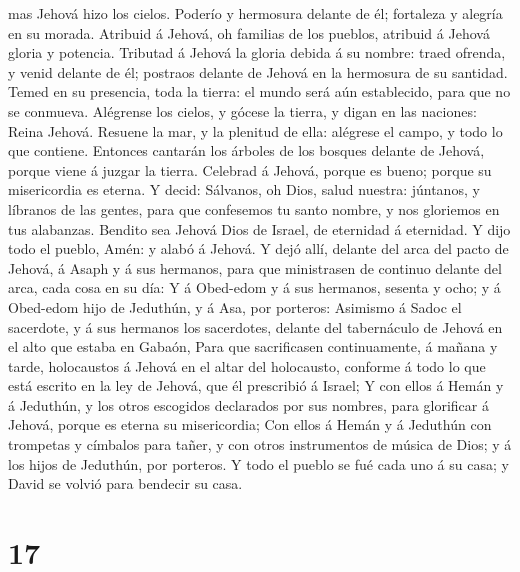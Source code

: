 mas Jehová hizo los cielos.  Poderío y hermosura delante de
él; fortaleza y alegría en su morada.  Atribuid á Jehová,
oh familias de los pueblos, atribuid á Jehová gloria y potencia.
 Tributad á Jehová la gloria debida á su nombre: traed
ofrenda, y venid delante de él; postraos delante de Jehová en la
hermosura de su santidad.  Temed en su presencia, toda la
tierra: el mundo será aún establecido, para que no se conmueva.
 Alégrense los cielos, y gócese la tierra, y digan en las
naciones: Reina Jehová.  Resuene la mar, y la plenitud de
ella: alégrese el campo, y todo lo que contiene.  Entonces
cantarán los árboles de los bosques delante de Jehová, porque viene á
juzgar la tierra.  Celebrad á Jehová, porque es bueno;
porque su misericordia es eterna.  Y decid: Sálvanos, oh
Dios, salud nuestra: júntanos, y líbranos de las gentes, para que
confesemos tu santo nombre, y nos gloriemos en tus alabanzas.
 Bendito sea Jehová Dios de Israel, de eternidad á
eternidad. Y dijo todo el pueblo, Amén: y alabó á Jehová. 
Y dejó allí, delante del arca del pacto de Jehová, á Asaph y á sus
hermanos, para que ministrasen de continuo delante del arca, cada cosa
en su día:  Y á Obed-edom y á sus hermanos, sesenta y ocho;
y á Obed-edom hijo de Jeduthún, y á Asa, por porteros: 
Asimismo á Sadoc el sacerdote, y á sus hermanos los sacerdotes, delante
del tabernáculo de Jehová en el alto que estaba en Gabaón, 
Para que sacrificasen continuamente, á mañana y tarde, holocaustos á
Jehová en el altar del holocausto, conforme á todo lo que está escrito
en la ley de Jehová, que él prescribió á Israel;  Y con
ellos á Hemán y á Jeduthún, y los otros escogidos declarados por sus
nombres, para glorificar á Jehová, porque es eterna su misericordia;
 Con ellos á Hemán y á Jeduthún con trompetas y címbalos
para tañer, y con otros instrumentos de música de Dios; y á los hijos de
Jeduthún, por porteros.  Y todo el pueblo se fué cada uno á
su casa; y David se volvió para bendecir su casa.

\hypertarget{section-16}{%
\section{17}\label{section-16}}

